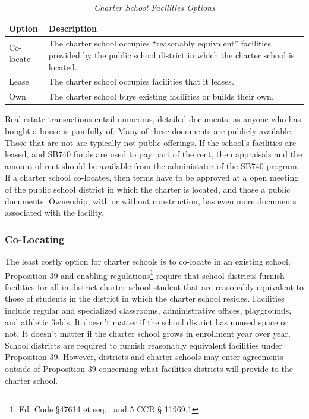 \begin{table}[ht]
  \small%
  \caption[Charter School Facilities Options]{\textit{Charter School Facilities Options}}\label{tab:charter-facilities-options}%
  \begin{tabular}{ll}
    \toprule%
    Option    & Description \\
    \midrule%
    Co-locate & \multirow[t]{2}{4.75in}{The charter school occupies ``reasonably equivalent'' facilities provided by 
                the public school district in which the charter school is located.}\\
                \\
    Lease     & The charter school occupies facilities that it leases.\\
    Own       & The charter school buys existing facilities or builds their own. \\
    \bottomrule%
  \end{tabular}
\end{table}

Real estate transactions entail numerous, detailed documents, as anyone who has bought a house is painfully of. Many of these documents are publicly available. Those that are not are typically not public offerings. If the school's facilities are leased, and SB740 funds are used to pay part of the rent, then appraisals and the amount of rent should be available from the administator of the SB740 program. If a charter school co-locates, then terms have to be approved at a open meeting of the public school district in which the charter is located, and those a public documents. Ownership, with or without construction, has even more documents associated with the facility.

\subsubsection{Co-Locating}\label{sec:co-locating}\indent

The least costly option for charter schools is to co-locate in an existing school. Proposition 39 and enabling regulations\footnote{Ed. Code §47614 et seq.  and 5 CCR § 11969.1} require that school districts furnish facilities for all in-district charter school student that are reasonably equivalent to those of students in the district in which the charter school resides. Facilities include regular and specialized classrooms, administrative offices, playgrounds, and athletic fields. It doesn't matter if the school district has unused space or not. It doesn't matter if the charter school grows in enrollment year over year. School districts are required to furnish reasonably equivalent facilities under Proposition 39. However, districts and charter schools may enter agreements outside of Proposition 39 concerning what facilities districts will provide to the charter school.

